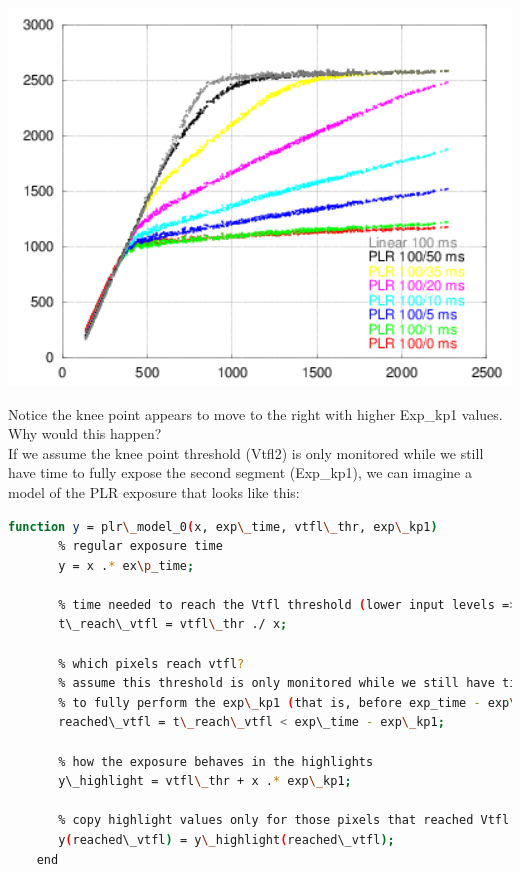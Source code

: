 \begin{center}
\includegraphics[height=10cm]{images/100-x-32-plr-vs-30ms-lin}
\end{center}

Notice the knee point appears to move to the right with higher Exp\_kp1 values. Why would this happen?\\

If we assume the knee point threshold (Vtfl2) is only monitored while we still have time to fully expose the second segment (Exp\_kp1), we can imagine a model of the PLR exposure that looks like this:\\

\begin{lstlisting}[language=bash,morekeywords=$,keywordstyle=\bfseries,frame=none,xleftmargin=.25in,belowskip=2em, aboveskip=2em]
    function y = plr\_model_0(x, exp\_time, vtfl\_thr, exp\_kp1)
       % regular exposure time
       y = x .* ex\p_time;
       
       % time needed to reach the Vtfl threshold (lower input levels => longer times)
       t\_reach\_vtfl = vtfl\_thr ./ x;
       
       % which pixels reach vtfl?
       % assume this threshold is only monitored while we still have time
       % to fully perform the exp\_kp1 (that is, before exp_time - exp\_kp1)
       reached\_vtfl = t\_reach\_vtfl < exp\_time - exp\_kp1;
       
       % how the exposure behaves in the highlights
       y\_highlight = vtfl\_thr + x .* exp\_kp1;
       
       % copy highlight values only for those pixels that reached Vtfl
       y(reached\_vtfl) = y\_highlight(reached\_vtfl);
    end
\end{lstlisting}

